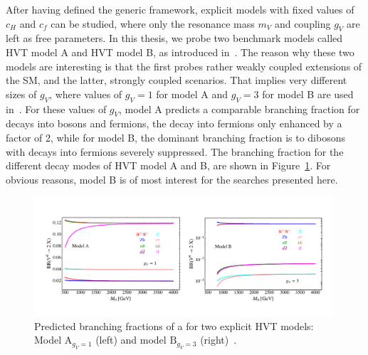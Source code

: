 After having defined the generic framework, explicit models with fixed values of $c_H$ and $c_f$ can be studied, where only the resonance mass $m_V$ and coupling $g_V$ are left as free parameters.
In this thesis, we probe two benchmark models called HVT model A and HVT model B, as introduced in~\cite{Pappadopulo:2014qza}. The reason why these two models are interesting is that the first probes rather weakly coupled extensions of the SM, and the latter, strongly coupled scenarios. That implies very different sizes of $g_V$, where values of $g_V = 1$ for model A and $g_V = 3$ for model B are used in~\cite{Pappadopulo:2014qza}. For these values of $g_V$, model A predicts a comparable branching fraction for decays into bosons and fermions, the decay into fermions only enhanced by a factor of 2, while for model B, the dominant branching fraction is to dibosons with decays into fermions severely suppressed. The branching fraction for the different decay modes of HVT model A and B, are shown in Figure~\ref{fig:theory:hvtBR}. For obvious reasons, model B is of most interest for the searches presented here.
\begin{figure}[h!]
\centering
\includegraphics[width=0.99\textwidth]{figures/theory/hvtmodels.pdf}
\caption{Predicted branching fractions of a \PZpr for two explicit HVT models: Model  $\mathrm{A}_{g_V=1}$ (left) and model $\mathrm{B}_{g_V=3}$ (right)~\cite{Pappadopulo:2014qza}.}
\label{fig:theory:hvtBR}
\end{figure}
\clearpage

